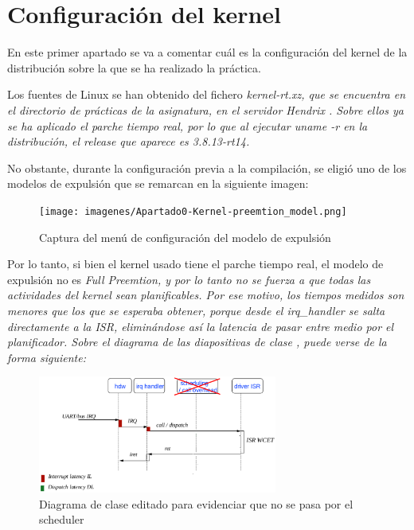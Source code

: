 \documentclass[../main.tex]{subfiles}
\begin{document}
\section{Configuración del kernel}

En este primer apartado se va a comentar cuál es la configuración del kernel de la distribución sobre la que se ha realizado la práctica. 

Los fuentes de Linux se han obtenido del fichero \it{kernel-rt.xz}, que se encuentra en el directorio de prácticas de la asignatura, en el servidor Hendrix \cite{fuentes-Linux}. Sobre ellos ya se ha aplicado el parche tiempo real, por lo que al ejecutar \it{uname -r} en la distribución, el release que aparece es \it{3.8.13-rt14}.

No obstante, durante la configuración previa a la compilación, se eligió uno de los modelos de expulsión que se remarcan en la siguiente imagen:

\begin{figure}[h]
\centering
\texttt{[image: imagenes/Apartado0-Kernel-preemtion\_model.png]}
\caption{Captura del menú de configuración del modelo de expulsión}
\end{figure}

Por lo tanto, si bien el kernel usado tiene el parche tiempo real, el modelo de expulsión no es \it{Full Preemtion}, y por lo tanto no se fuerza a que todas las actividades del kernel sean planificables. Por ese motivo, los tiempos medidos son menores que los que se esperaba obtener, porque desde el \it{irq\_handler} se salta directamente a la \it{ISR}, eliminándose así la latencia de pasar entre medio por el planificador. Sobre el diagrama de las diapositivas de clase \cite{diagrama-latencia}, puede verse de la forma siguiente: 

\begin{figure}[h]
\centering
\includegraphics[width=0.7\textwidth]{imagenes/Apartado0-LatenciaInterrupcion.png}
\caption{Diagrama de clase editado para evidenciar que no se pasa por el scheduler}
\end{figure}
\end{document}
